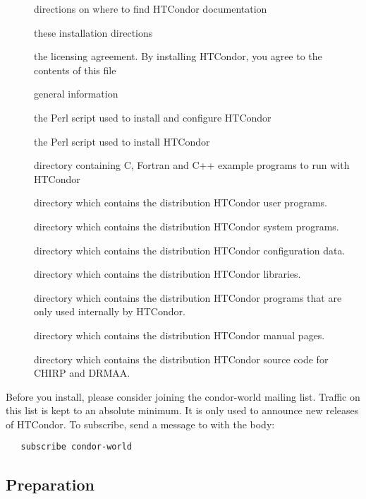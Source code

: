 \begin{description}
\item[] directions on where to find HTCondor documentation
\item[] these installation directions
\item[] the licensing agreement.
                  By installing HTCondor, you agree to the contents of
		  this file
\item[] general information
\item[] the Perl script used to install and
                  configure HTCondor
\item[] the Perl script used to install HTCondor
\item[] directory containing C, Fortran and C++ example
		  programs to run with HTCondor
\item[] directory which contains the distribution HTCondor
		  user programs.
\item[] directory which contains the distribution HTCondor
		  system programs.
\item[] directory which contains the distribution HTCondor
		  configuration data.
\item[] directory which contains the distribution HTCondor
		  libraries.
\item[] directory which contains the distribution HTCondor
		  programs that are only used internally by HTCondor.
\item[] directory which contains the distribution HTCondor
		  manual pages.
\item[] directory which contains the distribution HTCondor
		  source code for CHIRP and DRMAA.
\end{description}

Before you install, please consider joining the condor-world mailing
list.
Traffic on this list is kept to an absolute minimum.
It is only used to announce new releases of HTCondor.
To subscribe, send a message to  with the body:
\begin{verbatim}
   subscribe condor-world 
\end{verbatim}

\subsection{\label{sec:Preparing-to-Install}Preparation} 

